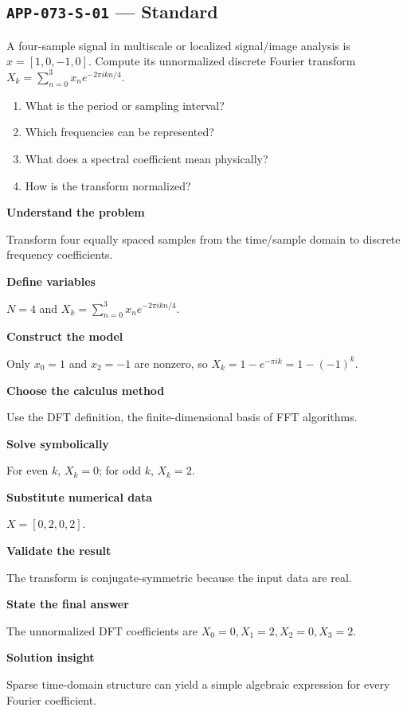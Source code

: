\documentclass[11pt]{book}
\newcommand{\pid}[1]{\texttt{#1}}
\begin{document}
\subsection*{\pid{APP-073-S-01} — Standard}
\begin{problembox}
A four-sample signal in multiscale or localized signal/image analysis is $x=[1,0,-1,0]$. Compute its unnormalized discrete Fourier transform $X_k=\sum_{n=0}^3 x_ne^{-2\pi i kn/4}$.
\end{problembox}
\begin{promptbox}\begin{enumerate}
\item What is the period or sampling interval?
\item Which frequencies can be represented?
\item What does a spectral coefficient mean physically?
\item How is the transform normalized?
\end{enumerate}\end{promptbox}
\begin{solutionbox}
\textbf{Understand the problem}\par Transform four equally spaced samples from the time/sample domain to discrete frequency coefficients.\par\medskip
\textbf{Define variables}\par $N=4$ and $X_k=\sum_{n=0}^{3}x_n e^{-2\pi i kn/4}$.\par\medskip
\textbf{Construct the model}\par Only $x_0=1$ and $x_2=-1$ are nonzero, so $X_k=1-e^{-\pi i k}=1-(-1)^k$.\par\medskip
\textbf{Choose the calculus method}\par Use the DFT definition, the finite-dimensional basis of FFT algorithms.\par\medskip
\textbf{Solve symbolically}\par For even $k$, $X_k=0$; for odd $k$, $X_k=2$.\par\medskip
\textbf{Substitute numerical data}\par $X=[0,2,0,2]$.\par\medskip
\textbf{Validate the result}\par The transform is conjugate-symmetric because the input data are real.\par\medskip
\textbf{State the final answer}\par The unnormalized DFT coefficients are $X_0=0,X_1=2,X_2=0,X_3=2$.\par\medskip
\textbf{Solution insight}\par Sparse time-domain structure can yield a simple algebraic expression for every Fourier coefficient.\par\medskip
\end{solutionbox}
\end{document}
